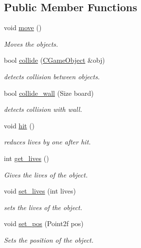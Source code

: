 \subsection*{Public Member Functions}
\begin{DoxyCompactItemize}
\item 
void \hyperlink{class_c_game_object_a5fecb17a62f57564f27a5e1120721e12}{move} ()
\begin{DoxyCompactList}\small\item\em Moves the objects. \end{DoxyCompactList}\item 
bool \hyperlink{class_c_game_object_a095ec5e8e92a7442f444a1d3b7e200da}{collide} (\hyperlink{class_c_game_object}{C\+Game\+Object} \&obj)
\begin{DoxyCompactList}\small\item\em detects collision between objects. \end{DoxyCompactList}\item 
bool \hyperlink{class_c_game_object_af1e3da2a3e10a0c11c090056eb0d027e}{collide\+\_\+wall} (Size board)
\begin{DoxyCompactList}\small\item\em detects collision with wall. \end{DoxyCompactList}\item 
void \hyperlink{class_c_game_object_ab66892d3d3db14c4b7e427f341c949dd}{hit} ()
\begin{DoxyCompactList}\small\item\em reduces lives by one after hit. \end{DoxyCompactList}\item 
int \hyperlink{class_c_game_object_a9c794264bb1c37231f137b0df3a8ccbc}{get\+\_\+lives} ()
\begin{DoxyCompactList}\small\item\em Gives the lives of the object. \end{DoxyCompactList}\item 
void \hyperlink{class_c_game_object_a1fbab5676bc0491dd10266bce54ad577}{set\+\_\+lives} (int lives)
\begin{DoxyCompactList}\small\item\em sets the lives of the object. \end{DoxyCompactList}\item 
void \hyperlink{class_c_game_object_a30b40c39c694e618e77b7c74fbd490cd}{set\+\_\+pos} (Point2f pos)
\begin{DoxyCompactList}\small\item\em Sets the position of the object. \end{DoxyCompactList}\item 

\end{DoxyCompactItemize}
